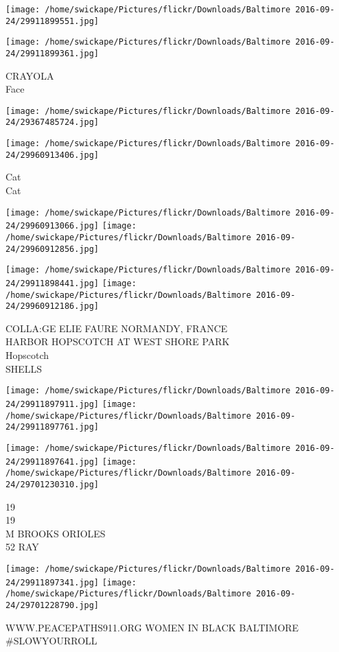 \documentclass[10pt,letterpaper]{article}
\begin{document}
\texttt{[image: /home/swickape/Pictures/flickr/Downloads/Baltimore 2016-09-24/29911899551.jpg]}

\vspace{0.25in}
\texttt{[image: /home/swickape/Pictures/flickr/Downloads/Baltimore 2016-09-24/29911899361.jpg]}

CRAYOLA\\
Face
\pagebreak

\texttt{[image: /home/swickape/Pictures/flickr/Downloads/Baltimore 2016-09-24/29367485724.jpg]}

\vspace{0.25in}
\texttt{[image: /home/swickape/Pictures/flickr/Downloads/Baltimore 2016-09-24/29960913406.jpg]}

Cat\\
Cat
\pagebreak

\texttt{[image: /home/swickape/Pictures/flickr/Downloads/Baltimore 2016-09-24/29960913066.jpg]}
\texttt{[image: /home/swickape/Pictures/flickr/Downloads/Baltimore 2016-09-24/29960912856.jpg]}

\texttt{[image: /home/swickape/Pictures/flickr/Downloads/Baltimore 2016-09-24/29911898441.jpg]}
\texttt{[image: /home/swickape/Pictures/flickr/Downloads/Baltimore 2016-09-24/29960912186.jpg]}

COLLA:GE ELIE FAURE NORMANDY, FRANCE\\
HARBOR HOPSCOTCH AT WEST SHORE PARK\\
Hopscotch\\
SHELLS
\pagebreak

\texttt{[image: /home/swickape/Pictures/flickr/Downloads/Baltimore 2016-09-24/29911897911.jpg]}
\texttt{[image: /home/swickape/Pictures/flickr/Downloads/Baltimore 2016-09-24/29911897761.jpg]}

\texttt{[image: /home/swickape/Pictures/flickr/Downloads/Baltimore 2016-09-24/29911897641.jpg]}
\texttt{[image: /home/swickape/Pictures/flickr/Downloads/Baltimore 2016-09-24/29701230310.jpg]}

19\\
19\\
M BROOKS ORIOLES\\
52 RAY
\pagebreak

\texttt{[image: /home/swickape/Pictures/flickr/Downloads/Baltimore 2016-09-24/29911897341.jpg]}
\texttt{[image: /home/swickape/Pictures/flickr/Downloads/Baltimore 2016-09-24/29701228790.jpg]}

WWW.PEACEPATHS911.ORG WOMEN IN BLACK BALTIMORE\\
\#SLOWYOURROLL
\pagebreak
\end{document}
